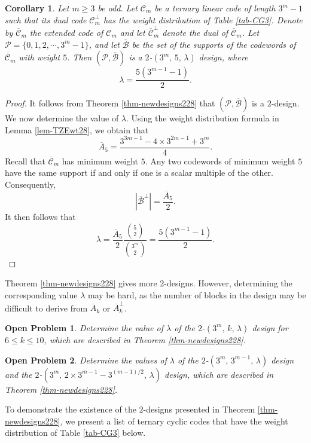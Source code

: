 \documentclass[1p,final]{elsarticle}
\newtheorem{corollary}[theorem]{Corollary}
\newtheorem{open}{Open Problem}
\newcommand{\cP}{{\mathcal{P}}}
\newcommand{\cB}{{\mathcal{B}}}
\newcommand{\C}{{\mathcal{C}}}
\begin{document}
\begin{corollary} 
Let $m \geq 3$ be odd. 
Let $\C_m$ be a ternary linear code of length $3^m-1$ such that its dual code
$\C_m^\perp$ has the weight distribution of Table \ref{tab-CG3}. Denote by $\overline{\C}_m$ 
the extended code of $\C_m$ and let $\overline{\C}_m^\perp$ denote the dual of $\overline{\C}_m$.
Let $\cP=\{0,1,2, \cdots, 3^m-1\}$, and let $\overline{\cB}$ be  the set of the supports of the codewords of $\overline{\C}_m$
with weight $5$. Then $(\cP, \overline{\cB})$
is a $2$-$(3^m,\, 5,\, \lambda)$ design, where  
$$ 
\lambda=\frac{5(3^{m-1}-1)}{2}.  
$$ 
\end{corollary} 

\begin{proof}
It follows from Theorem \ref{thm-newdesigns228} that $(\cP, \overline{\cB})$ is a $2$-design. 
We now determine the value of $\lambda$. Using the weight distribution formula in Lemma 
\ref{lem-TZEwt28}, we obtain that 
$$ 
\overline{A}_5=\frac{3^{3m-1}-4 \times 3^{2m-1}+3^m}{4}. 
$$ 
Recall that $\overline{\C}_m$ has minimum weight 
$5$. Any two codewords of minimum weight $5$ have the same support if and only if one is a 
scalar multiple of the other. Consequently, 
$$ 
\left|\overline{\cB}^\perp \right|=\frac{\overline{A}_5}{2}. 
$$
It then follows that 
$$ 
\lambda= \frac{\overline{A}_5}{2} \frac{\binom{5}{2}}{\binom{3^m}{2}}=\frac{5(3^{m-1}-1)}{2}.  
$$
\end{proof} 

Theorem \ref{thm-newdesigns228} gives more $2$-designs. However, determining the corresponding 
value $\lambda$ may be hard, as the number of blocks in the design may be difficult to derive  
from $\overline{A}_k$ or $\overline{A}_k^\perp$. 

\begin{open} 
Determine the value of $\lambda$ of the $2$-$(3^m,\, k,\, \lambda)$ design for  $6 \leq k \leq 10$,  
which are described in Theorem \ref{thm-newdesigns228}. 
\end{open} 

\begin{open} 
Determine the values of $\lambda$ of the $2$-$(3^m,\, 3^{m-1},\, \lambda)$ design and the   
$2$-$(3^m,\, 2\times 3^{m-1}-3^{(m-1)/2},\, \lambda)$ design, 
which are described in Theorem \ref{thm-newdesigns228}. 
\end{open} 


To demonstrate the existence of the $2$-designs presented in Theorem \ref{thm-newdesigns228}, 
we present a list of ternary cyclic codes that have the weight distribution of Table \ref{tab-CG3} below.
\end{document}
